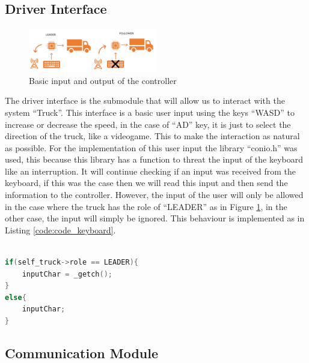 \subsection{Driver Interface}
\label{subsec:driver_interface}

\begin{figure}[ht]
    \centering
    \includegraphics[width=0.5\textwidth]{images/DriverInterface.png}
    \caption{Basic input and output of the controller}
    \label{img:DriverInterface}
\end{figure}

The driver interface is the submodule that will allow us to interact with the system “Truck”. This interface is a basic user input using the keys “WASD” to increase or decrease the speed, in the case of “AD” key, it is just to select the direction of the truck, like a videogame. This to make the interaction as natural as possible. 
For the implementation of this user input the library “conio.h” was used, this because this library has a function to threat the input of the keyboard like an interruption. It will continue checking if an input was received from the keyboard, if this was the case then we will read this input and then send the information to the controller.
However, the input of the user will only be allowed in the case where the truck has the role of “LEADER” as in Figure \ref{img:DriverInterface}, in the other case, the input will simply be ignored. This behaviour is implemented as in Listing \ref{code:code_keyboard}.


\begin{lstlisting}[language = C++, caption=Driver interface only available for leader, label = code:code_keyboard]

if(self_truck->role == LEADER){
    inputChar = _getch();
}
else{
    inputChar;
}
\end{lstlisting}

\subsection{Communication Module}
\label{subsec:communication_module} 

